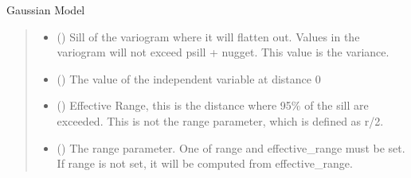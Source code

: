 \documentclass[letterpaper,10pt,english]{sphinxmanual}
\begin{document}

\begin{fulllineitems}
\label{\detokenize{covariance:glomar_gridding.variogram.GaussianVariogram}}
\pysigstartsignatures
\pysiglinewithargsret
{}
{\sphinxparamcomma {}\sphinxparamcomma {}\sphinxparamcomma {}}
{}
\pysigstopsignatures
\sphinxAtStartPar
Gaussian Model
\begin{quote}\begin{description}
\begin{itemize}
\item {}
\sphinxAtStartPar
{} () \textendash{} Sill of the variogram where it will flatten out. Values in the variogram
will not exceed psill + nugget. This value is the variance.

\item {}
\sphinxAtStartPar
{} () \textendash{} The value of the independent variable at distance 0

\item {}
\sphinxAtStartPar
{} () \textendash{} Effective Range, this is the distance where 95\% of the sill are
exceeded. This is not the range parameter, which is defined as r/2.

\item {}
\sphinxAtStartPar
{} () \textendash{} The range parameter. One of range and effective\_range must be set. If
range is not set, it will be computed from effective\_range.


\end{itemize}
\end{description}
\end{quote}
\end{fulllineitems}
\end{document}
